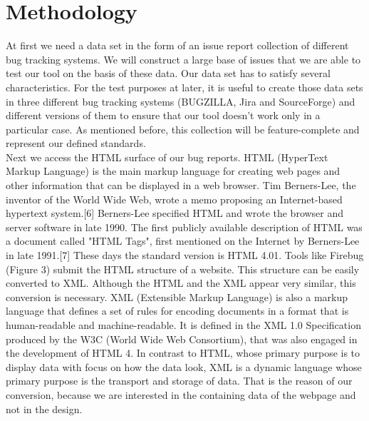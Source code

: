 \section{Methodology}
\label{Methodology}
At first we need a data set in the form of an issue report collection of different bug tracking systems. We will construct a large base of issues that we are able to test our tool on the basis of these data. Our data set has to satisfy several characteristics. For the test purposes at later, it is useful to create those data sets in three different bug tracking systems (BUGZILLA, Jira and SourceForge) and different versions of them to ensure that our tool doesn't work only in a particular case. As mentioned before, this collection will be feature-complete and represent our defined standards. \\ Next we access the HTML surface of our bug reports. HTML (HyperText Markup Language) is the main markup language for creating web pages and other information that can be displayed in a web browser. Tim Berners-Lee, the inventor of the World Wide Web, wrote a memo proposing an Internet-based hypertext system.[6] Berners-Lee specified HTML and wrote the browser and server software in late 1990. The first publicly available description of HTML was a document called "HTML Tags", first mentioned on the Internet by Berners-Lee in late 1991.[7] These days the standard version is HTML 4.01. Tools like Firebug (Figure 3) submit the HTML structure of a website. This structure can be easily converted to XML. Although the HTML and the XML appear very similar, this conversion is necessary. XML (Extensible Markup Language) is also a markup language that defines a set of rules for encoding documents in a format that is human-readable and machine-readable. It is defined in the XML 1.0 Specification produced by the W3C (World Wide Web Consortium), that was also engaged in the development of HTML 4. In contrast to HTML, whose primary purpose is to display data with focus on how the data look, XML is a dynamic language whose primary purpose is the transport and storage of data. That is the reason of our conversion, because we are interested in the containing data of the webpage and not in the design.\\ 